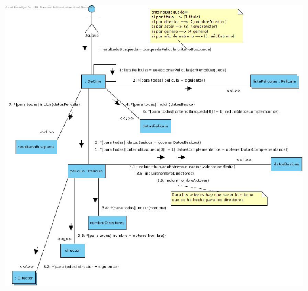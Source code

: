 \documentclass{article}
\begin{document}
\includegraphics[width=1.3\linewidth]{./R-6}
\pagebreak
\end{document}
